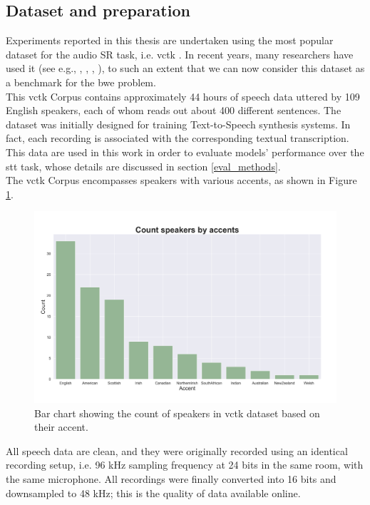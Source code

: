 \subsection{Dataset and preparation}
Experiments reported in this thesis are undertaken using the most popular dataset for the audio SR task, i.e. \gls{vctk} \cite{yamagishi2019cstr}. In recent years, many researchers have used it (see e.g., \cite{birnbaum2019temporal}, \cite{lim2018time}, \cite{eskimez2019speech}, \cite{wang2018speech}), to such an extent that we can now consider this dataset as a benchmark for the \gls{bwe} problem. \\
This \gls{vctk} Corpus contains approximately 44 hours of speech data uttered by 109 English speakers, each of whom reads out about 400 different sentences. The dataset was initially designed for training Text-to-Speech synthesis systems. In fact, each recording is associated with the corresponding textual transcription. This data are used in this work in order to evaluate models' performance over the \gls{stt} task, whose details are discussed in section \ref{eval_methods}. \\
The \gls{vctk} Corpus encompasses speakers with various accents, as shown in Figure \ref{fig:accents_speakers}. \\
\begin{figure}[!htb]
	\begin{center}
		\includegraphics[scale=0.4]{img/count_speakers_by_accents.png}
		\caption{Bar chart showing the count of speakers in \gls{vctk} dataset based on their accent.}
		\label{fig:accents_speakers}
	\end{center}
\end{figure}
\noindent All speech data are clean, and they were originally recorded using an identical recording setup, i.e. 96 kHz sampling frequency at 24 bits in the same room, with the same microphone. All recordings were finally converted into 16 bits and downsampled to 48 kHz; this is the quality of data available online. \\
